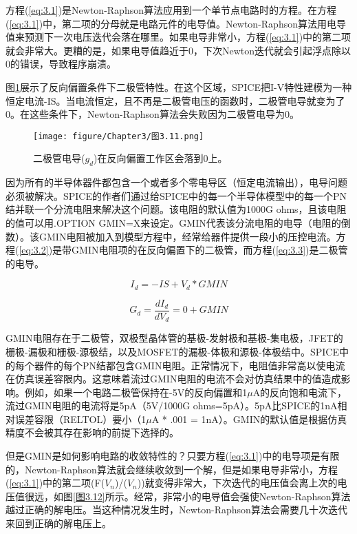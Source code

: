 方程(\ref{eq:3.1})是Newton-Raphson算法应用到一个单节点电路时的方程。在方程(\ref{eq:3.1})中，第二项的分母就是电路元件的电导值。Newton-Raphson算法用电导值来预测下一次电压迭代会落在哪里。如果电导非常小，方程(\ref{eq:3.1})中的第二项就会非常大。更糟的是，如果电导值趋近于0，下次Newton迭代就会引起浮点除以0的错误，导致程序崩溃。

图\ref{图3.11}展示了反向偏置条件下二极管特性。在这个区域，SPICE把I-V特性建模为一种恒定电流-IS。当电流恒定，且不再是二极管电压的函数时，二极管电导就变为了0。在这些条件下，Newton-Raphson算法会失败因为二极管电导为0。

\begin{figure}[htbp]
\small
    \centering
    \texttt{[image: figure/Chapter3/图3.11.png]}
    \caption{二极管电导($g_d$)在反向偏置工作区会落到0上。}
    \label{图3.11}
\end{figure}

因为所有的半导体器件都包含一个或者多个零电导区（恒定电流输出），电导问题必须被解决。SPICE的作者们通过给SPICE中的每一个半导体模型中的每一个PN结并联一个分流电阻来解决这个问题。该电阻的默认值为1000G ohms，且该电阻的值可以用.OPTION GMIN=X来设定。GMIN代表该分流电阻的电导（电阻的倒数）。该GMIN电阻被加入到模型方程中，经常给器件提供一段小的压控电流。方程(\ref{eq:3.2})是带GMIN电阻项的在反向偏置下的二极管，而方程(\ref{eq:3.3})是二极管的电导。

\begin{equation}
    I_d = -IS + V_d *GMIN
    \label{eq:3.2}
\end{equation}

\begin{equation}
    G_d = \frac{dI_d}{dV_d}=0 + GMIN
    \label{eq:3.3}
\end{equation}

GMIN电阻存在于二极管，双极型晶体管的基极-发射极和基极-集电极，JFET的栅极-漏极和栅极-源极结，以及MOSFET的漏极-体极和源极-体极结中。SPICE中的每个器件的每个PN结都包含GMIN电阻。正常情况下，电阻值非常高以使电流在仿真误差容限内。这意味着流过GMIN电阻的电流不会对仿真结果中的值造成影响。例如，如果一个电路二极管保持在-5V的反向偏置和1$\mu$A的反向饱和电流下，流过GMIN电阻的电流将是5pA（5V/1000G ohms=5pA）。5pA比SPICE的1nA相对误差容限（RELTOL）要小（1$\mu$A * .001 = 1nA）。GMIN的默认值是根据仿真精度不会被其存在影响的前提下选择的。

但是GMIN是如何影响电路的收敛特性的？只要方程(\ref{eq:3.1})中的电导项是有限的，Newton-Raphson算法就会继续收敛到一个解，但是如果电导非常小，方程(\ref{eq:3.1})中的第二项(F($V_n$)/($V_n$))就变得非常大，下次迭代的电压值会离上次的电压值很远，如图\ref{图3.12}所示。经常，非常小的电导值会强使Newton-Raphson算法越过正确的解电压。当这种情况发生时，Newton-Raphson算法会需要几十次迭代来回到正确的解电压上。

